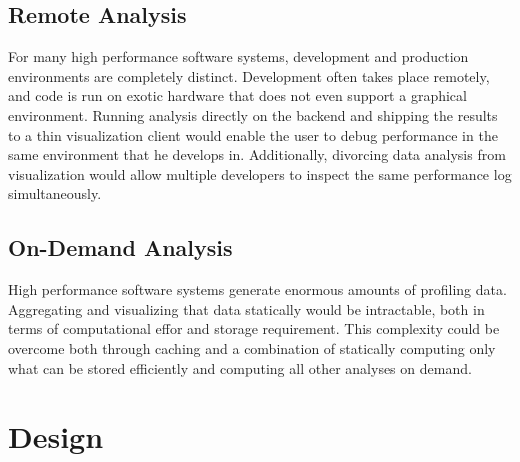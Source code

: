 \documentclass[annual]{acmsiggraph}
\begin{document}
  \subsection{Remote Analysis}

  For many high performance software systems, development and production environments are completely distinct.
  Development often takes place remotely, and code is run on exotic hardware that does not even support a graphical environment.
  Running analysis directly on the backend and shipping the results to a thin visualization client would enable 
    the user to debug performance in the same environment that he develops in.
  Additionally, divorcing data analysis from visualization would allow multiple developers to inspect the same performance
    log simultaneously.

  \subsection{On-Demand Analysis}
   
  High performance software systems generate enormous amounts of profiling data.
  Aggregating and visualizing that data statically would be intractable, 
    both in terms of computational effor and storage requirement.
  This complexity could be overcome both through caching and a combination of statically computing only what can
    be stored efficiently and computing all other analyses on demand.

\section {Design}\label{ch_d}
\end{document}
